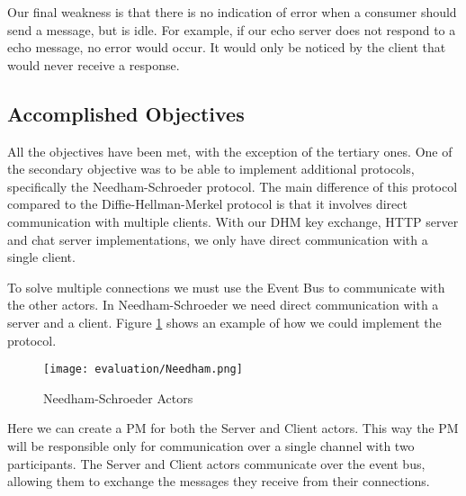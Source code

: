 Our final weakness is that there is no indication of error when a consumer should send a message, but is idle. For example, if our echo server does not respond to a echo message, no error would occur. It would only be noticed by the client that would never receive a response. 



\subsection{Accomplished Objectives}
All the objectives have been met, with the exception of the tertiary ones. One of the secondary objective was to be able to implement additional protocols, specifically the Needham-Schroeder protocol. The main difference of this protocol compared to the Diffie-Hellman-Merkel protocol is that it involves direct communication with multiple clients. With our DHM key exchange, HTTP server and chat server implementations, we only have direct communication with a single client.

To solve multiple connections we must use the Event Bus to communicate with the other actors. In Needham-Schroeder we need direct communication with a server and a client. Figure \ref{fig:Needham} shows an example of how we could implement the protocol. 

\begin{figure}[H]
  \centering
  \texttt{[image: evaluation/Needham.png]}
  \caption{Needham-Schroeder Actors}
  \label{fig:Needham}
\end{figure}

Here we can create a PM for both the Server and Client actors. This way the PM will be responsible only for communication over a single channel with two participants. The Server and Client actors communicate over the event bus, allowing them to exchange the messages they receive from their connections.

